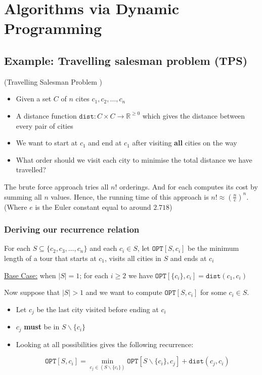 \documentclass{article}
\begin{document}
\section{Algorithms via Dynamic Programming}

\subsection{Example: Travelling salesman problem (TPS)}

\begin{problem}(Travelling Salesman Problem )
  \begin{itemize}
    \item Given a set $C$ of $n$ cites $c_{1},c_{2},\ldots,c_{n} $
    \item A distance function $\texttt{dist} : C \times C \rightarrow \mathbb{R}^{\geq 0}$ which gives the distance between every pair of cities
    \item We want to start at $c_{1}$ and end at $c_{1}$ after visiting \textbf{all} cities on the way
    \item What order should we visit each city to minimise the total distance we have travelled?
  \end{itemize}
\end{problem}

The brute force approach tries all $n!$ orderings. And for each computes its cost by summing all $n$ values. Hence, the running time of this approach is $n! \approx \left( \frac{n}{e}\right)^{n}$. (Where $e$ is the Euler constant equal to around $2.718$)

\subsubsection{Deriving our recurrence relation }

For each $S \subseteq \{ c_{2},c_{3},\ldots, c_{n} \} $ and each $c_{i} \in S$, let $\texttt{OPT}[S,c_{i}] $ be the minimum length of a tour that starts at $c_{1}$, visits all cities in $S$ and ends at $c_{i}$

\underline{Base Case:} when $|S|=1$; for each $i\geq 2$ we have $\texttt{OPT} [\{ c_{i} \}, c_{i} ] = \texttt{dist}(c_{1},c_{i})$

Now suppose that $|S|> 1$ and we want to compute $\texttt{OPT}[S,c_{i}]$ for some $c_{i} \in S$.

\begin{itemize}
  \item Let $c_{j}$ be the last city visited before ending at $c_{i}$
  \item $c_{j}$ \textbf{must } be in $S \backslash \{ c_{i} \} $
  \item Looking at all possibilities gives the following recurrence:

        \[
        \texttt{OPT} [S,c_{i}] = \displaystyle\min_{c_{j}\in \left( S \backslash \{ c_{i} \} \right)} \texttt{OPT} [S\backslash \{ c_{i} \} , c_{j}] + \texttt{dist} (c_{j},c_{i})
        \]
\end{itemize}
\end{document}
